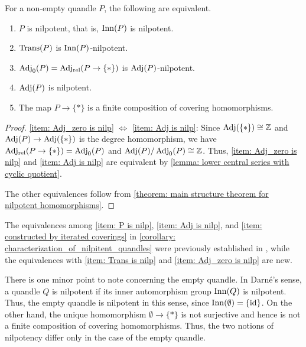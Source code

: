 \begin{cor}
\label{corollary: characterization_of_nilpitent_quandles}
    For a non-empty quandle $P$, the following are equivalent.
    \begin{enumerate}[label={(\roman*)}]
    \item\label{item: P is nilp} $P$ is nilpotent, that is, $\operatorname{Inn}(P)$ is nilpotent.
    \item\label{item: Trans is nilp} $\operatorname{Trans}(P)$ is $\operatorname{Inn}(P)$-nilpotent.
    \item\label{item: Adj_zero is nilp} $\operatorname{Adj}_0(P)=\operatorname{Adj_{rel}}(P\to \{\ast\})$ is $\operatorname{Adj}(P)$-nilpotent.
    \item\label{item: Adj is nilp} $\operatorname{Adj}(P)$ is nilpotent.
    \item\label{item: constructed by iterated coverings} The map $P\to \{\ast\}$ is a finite composition of covering homomorphisms.
\end{enumerate}
\end{cor}

\begin{proof}
\ref{item: Adj_zero is nilp} $\Leftrightarrow$ \ref{item: Adj is nilp}: 
Since $\operatorname{Adj}(\{*\})\cong\mathbb{Z}$ and $\operatorname{Adj}(P)\to\operatorname{Adj}(\{*\})$ is the degree homomorphism, we have $\operatorname{Adj_{rel}}(P\to\{*\})=\operatorname{Adj}_0(P)$ and $\operatorname{Adj}(P)/\operatorname{Adj}_0(P)\cong\mathbb{Z}$. 
Thus, \ref{item: Adj_zero is nilp} and \ref{item: Adj is nilp} are equivalent by \cref{lemma: lower central series with cyclic quotient}.

The other equivalences follow from \cref{theorem: main structure theorem for nilpotent homomorphisms}.
\end{proof}


\begin{rem}
    The equivalences among \ref{item: P is nilp}, \ref{item: Adj is nilp}, and \ref{item: constructed by iterated coverings} in \cref{corollary: characterization_of_nilpitent_quandles} were previously established in \cite[Corollary~2.5 and Theorem~2.13]{darne_2026_nilpotent_quandles}, while the equivalences with \ref{item: Trans is nilp} and \ref{item: Adj_zero is nilp} are new.
\end{rem}

\begin{rem}
\label{remark: minor caveat concerning the empty quandle}
    There is one minor point to note concerning the empty quandle. In Darn\'{e}'s sense, a quandle $Q$ is nilpotent if its inner automorphism group $\operatorname{Inn}(Q)$ is nilpotent. Thus, the empty quandle is nilpotent in this sense, since $\operatorname{Inn}(\emptyset)=\{\operatorname{id}\}$. On the other hand, the unique homomorphism $\emptyset\to\{\ast\}$ is not surjective and hence is not a finite composition of covering homomorphisms. Thus, the two notions of nilpotency differ only in the case of the empty quandle.
\end{rem}

